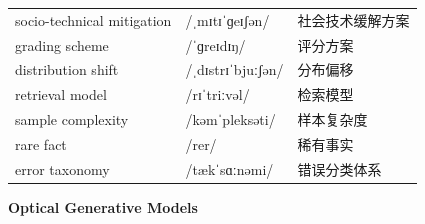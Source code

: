 \documentclass[UTF8,12pt,a4paper]{ctexart}
\providecommand{\zh}[1]{#1}
\begin{document}
\begin{tabular*}{\textwidth}{@{\extracolsep{\fill}}lll@{}}
socio-technical mitigation & {\ipafont /ˌmɪtɪˈɡeɪʃən/} & \zh{社会技术缓解方案} \\
grading scheme & {\ipafont /ˈɡreɪdɪŋ/} & \zh{评分方案} \\
distribution shift & {\ipafont /ˌdɪstrɪˈbjuːʃən/} & \zh{分布偏移} \\
retrieval model & {\ipafont /rɪˈtriːvəl/} & \zh{检索模型} \\
sample complexity & {\ipafont /kəmˈpleksəti/} & \zh{样本复杂度} \\
rare fact & {\ipafont /rer/} & \zh{稀有事实} \\
error taxonomy & {\ipafont /tækˈsɑːnəmi/} & \zh{错误分类体系} \\
\bottomrule
\end{tabular*}

\newpage

\begin{center}
    {\Large\bfseries Optical Generative Models}
\end{center}
\end{document}
